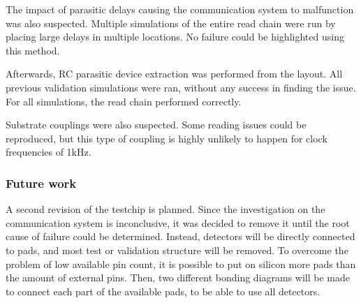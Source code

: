 The impact of parasitic delays causing the communication system to malfunction was also suspected.
Multiple simulations of the entire read chain were run by placing large delays in multiple locations.
No failure could be highlighted using this method.

Afterwards, RC parasitic device extraction was performed from the layout.
All previous validation simulations were ran, without any success in finding the issue.
For all simulations, the read chain performed correctly.

Substrate couplings were also suspected.
Some reading issues could be reproduced, but this type of coupling is highly unlikely to happen for clock frequencies of 1kHz.

\subsubsection{Future work}

A second revision of the testchip is planned.
Since the investigation on the communication system is inconclusive, it was decided to remove it until the root cause of failure could be determined.
Instead, detectors will be directly connected to pads, and most test or validation structure will be removed.
To overcome the problem of low available pin count, it is possible to put on silicon more pads than the amount of external pins.
Then, two different bonding diagrams will be made to connect each part of the available pads, to be able to use all detectors.
